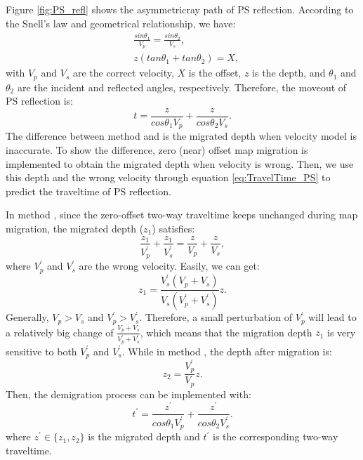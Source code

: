 
Figure \ref{fig:PS_refl} shows the asymmetricray path of PS reflection.
According to the Snell's law and geometrical relationship, we have:
\begin{equation}
\begin{split}
    &\frac{sin\theta_1}{V_p}=\frac{sin\theta_2}{V_s},\\
	&z(tan\theta_1+tan\theta_2)=X,
\end{split}
    \label{eq:Snell_PS} 
\end{equation}
with $V_p$ and $V_s$ are the correct velocity, $X$ is the offset, $z$ is the depth, 
and $\theta_1$ and $\theta_2$ are the incident and reflected angles, respectively.
Therefore, the moveout of PS reflection is:
\begin{equation}
	t=\frac{z}{cos\theta_1V_p}+\frac{z}{cos\theta_2V_s}.
    \label{eq:TravelTime_PS} 
\end{equation}
The difference between method {\bf\uppercase\expandafter{}} and {\bf\uppercase\expandafter{}} 
is the migrated depth when velocity model is inaccurate. 
To show the difference, zero (near) offset map migration is implemented
to obtain the migrated depth when velocity is wrong. Then, we use this depth and the
wrong velocity through equation \eqref{eq:TravelTime_PS} to predict the traveltime of PS reflection.

In method {\bf\uppercase\expandafter{}}, since the zero-offset two-way traveltime
keeps unchanged during map migration, the migrated depth ($z_{1}$) satisfies:
\begin{equation}
	\frac{z_{1}}{V^{'}_p}+\frac{z_{1}}{V^{'}_s}=\frac{z}{V_p}+\frac{z}{V_s},
	\label{eq:Mapmigration_PS} 
\end{equation}
where $V^{'}_p$ and $V^{'}_s$ are the wrong velocity. Easily, we can get:
\begin{equation}
	{z_{1}}=\frac{V^{'}_s(V_p+V_s)}{V_s(V^{'}_p+V^{'}_s)}z.
    \label{eq:ZerooffMig_PS} 
\end{equation}
Generally, $V_p>V_s$ and $V^{'}_p>V^{'}_s$. Therefore, a small perturbation of
$V^{'}_p$ will lead to a relatively big change of $\frac{V_p+V_s}{V^{'}_p+V^{'}_s}$, which
means that the migration depth $z_{1}$ is very sensitive to both $V^{'}_p$ and $V^{'}_s$. 
While in method \uppercase\expandafter{}, the depth after migration is: 
\begin{equation}
	{z_{2}}=\frac{V^{'}_p}{V_p}z.
    \label{eq:ZerooffMig_PP} 
\end{equation}
Then, the demigration process can be implemented with:
\begin{equation}
	t^{'}=\frac{z^{'}}{cos\theta_1V^{'}_p}+\frac{z^{'}}{cos\theta_2V^{'}_s}.
    \label{eq:Demigration_PS} 
\end{equation}
where $z^{'}\in\{z_1,z_2\}$ is the migrated depth and $t^{'}$ is the corresponding two-way traveltime.

